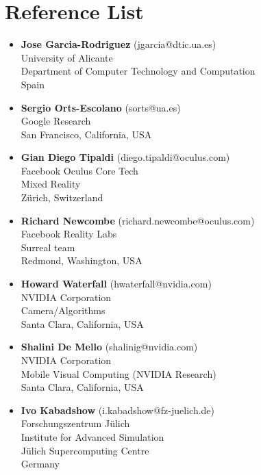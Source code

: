 \documentclass[8pt]{article}
\begin{document}
\section*{Reference List}
\begin{itemize}
	\item {\textbf{Jose Garcia-Rodriguez} (jgarcia@dtic.ua.es)\\
    University of Alicante\\
    Department of Computer Technology and Computation\\
    Spain\\}

  \item {\textbf{Sergio Orts-Escolano} (sorts@ua.es)\\
  Google Research\\
  San Francisco, California, USA\\}

  \item {\textbf{Gian Diego Tipaldi} (diego.tipaldi@oculus.com)\\
  Facebook Oculus Core Tech\\
  Mixed Reality\\
  Zürich, Switzerland\\}

  \item {\textbf{Richard Newcombe} (richard.newcombe@oculus.com)\\
  Facebook Reality Labs\\
  Surreal team\\
  Redmond, Washington, USA\\}

  \item {\textbf{Howard Waterfall} (hwaterfall@nvidia.com)\\
	NVIDIA Corporation\\
	Camera/Algorithms\\
	Santa Clara, California, USA\\}

  \item{\textbf{Shalini De Mello} (shalinig@nvidia.com)\\
	NVIDIA Corporation\\
	Mobile Visual Computing (NVIDIA Research)\\
	Santa Clara, California, USA\\}

  \item {\textbf{Ivo Kabadshow} (i.kabadshow@fz-juelich.de)\\
  Forschungszentrum Jülich\\
  Institute for Advanced Simulation\\
  Jülich Supercomputing Centre\\
  Germany\\}


\end{itemize}
 
\end{document}

